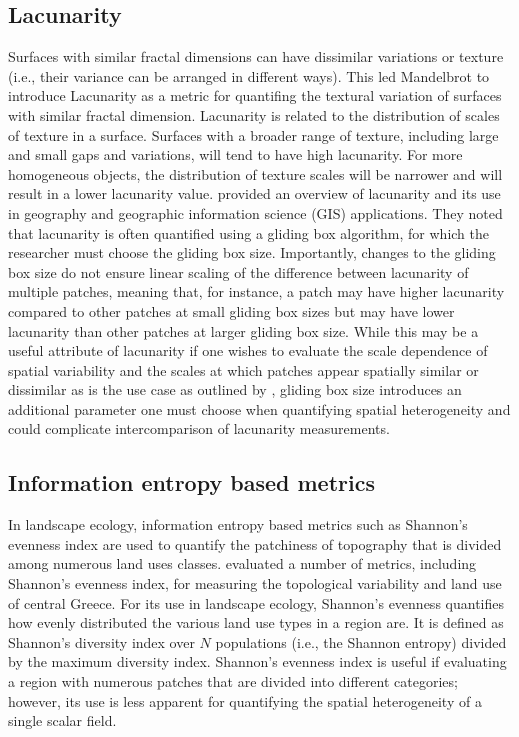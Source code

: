 \subsection{Lacunarity}
Surfaces with similar fractal dimensions can have dissimilar variations or texture (i.e., their variance can be arranged in different ways). This led Mandelbrot \parencite{mandelbrot_fractal_1983} to introduce Lacunarity as a metric for quantifing the textural variation of surfaces with similar fractal dimension. Lacunarity is related to the distribution of scales of texture in a surface. Surfaces with a broader range of texture, including large and small gaps and variations, will tend to have high lacunarity. For more homogeneous objects, the distribution of texture scales will be narrower and will result in a lower lacunarity value. \textcite{dong_lacunarity_2000} provided an overview of lacunarity and its use in geography and geographic information science (GIS) applications. They noted that lacunarity is often quantified using a gliding box algorithm, for which the researcher must choose the gliding box size. Importantly, changes to the gliding box size do not ensure linear scaling of the difference between lacunarity of multiple patches, meaning that, for instance, a patch may have higher lacunarity compared to other patches at small gliding box sizes but may have lower lacunarity than other patches at larger gliding box size. While this may be a useful attribute of lacunarity if one wishes to evaluate the scale dependence of spatial variability and the scales at which patches appear spatially similar or dissimilar as is the use case as outlined by \textcite{dong_lacunarity_2000}, gliding box size introduces an additional parameter one must choose when quantifying spatial heterogeneity and could complicate intercomparison of lacunarity measurements.

\subsection{Information entropy based metrics}
In landscape ecology, information entropy based metrics such as Shannon’s evenness index are used to quantify the patchiness of topography that is divided among numerous land uses classes. \textcite{plexida_selecting_2014} evaluated a number of metrics, including Shannon’s evenness index, for measuring the topological variability and land use of central Greece. For its use in landscape ecology, Shannon’s evenness quantifies how evenly distributed the various land use types in a region are. It is defined as Shannon’s diversity index over $N$ populations (i.e., the Shannon entropy) divided by the maximum diversity index. Shannon's evenness index is useful if evaluating a region with numerous patches that are divided into different categories; however, its use is less apparent for quantifying the spatial heterogeneity of a single scalar field.

